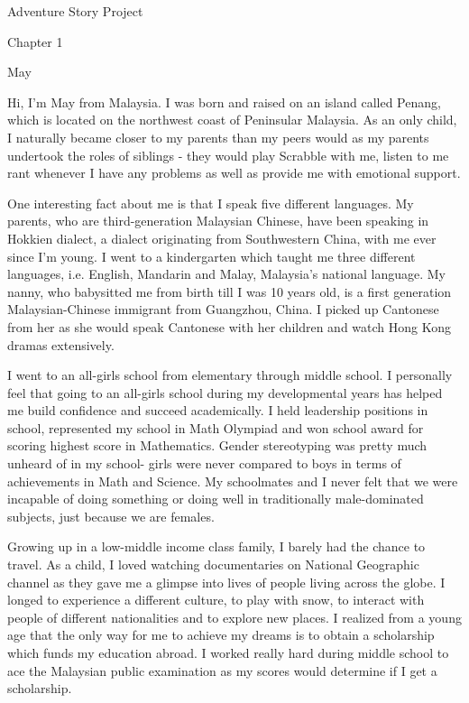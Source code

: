 \documentclass{article}
\begin{document}
\Huge Adventure Story Project

Chapter 1

May

Hi, I'm May from Malaysia. I was born and raised on an island called Penang, which is located on the northwest coast of Peninsular  Malaysia. As an only child, I naturally became closer to my parents than my peers would as my parents undertook the roles of siblings - they would play Scrabble with me, listen to me rant whenever I have any problems as well as provide me with emotional support. 

One interesting fact about me is that I speak five different languages. My parents, who are third-generation Malaysian Chinese, have been speaking in Hokkien dialect, a dialect originating from Southwestern China,  with me ever since I’m young. I went to a kindergarten which taught me three different languages, i.e. English, Mandarin and Malay, Malaysia’s national language. My nanny, who babysitted me from birth till I was 10 years old, is a first generation Malaysian-Chinese immigrant from Guangzhou, China.  I picked up Cantonese from her as she would speak Cantonese with her children and watch Hong Kong dramas extensively. 

I went to an all-girls school from elementary through middle school. I personally feel that going to an all-girls school during my developmental years has helped me build confidence and succeed academically. I held leadership positions in school, represented my school in Math Olympiad and won school award for scoring highest score in Mathematics. Gender stereotyping was pretty much unheard of in my school- girls were never compared to boys in terms of achievements in Math and Science. My schoolmates and I never felt that we were incapable of doing something or doing well in traditionally male-dominated subjects, just because we are females. 

Growing up in a low-middle income class family, I barely had the chance to travel. As a child, I loved watching documentaries on National Geographic channel as they gave me a glimpse into lives of people living across the globe. I longed to experience a different culture, to play with snow, to interact with people of different nationalities and to explore new places. I realized from a young age that the only way for me to achieve my dreams is to obtain a scholarship which funds my education abroad. I worked really hard during middle school to ace the Malaysian public examination as my scores would determine if I get a scholarship. 
\end{document}
